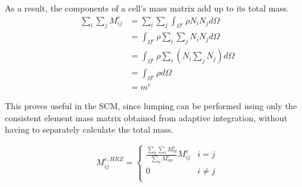 As a result, the components of a cell's mass matrix add up to its total mass.
\begin{equation}
\begin{aligned}
	\sum_i \sum_j M_{ij}^e &= \sum_i \sum_j \int_{\Omega^e} \rho N_i N_j d\Omega \\
	&= \int_{\Omega^e} \rho \sum_i \sum_j N_i N_j d\Omega \\
	&= \int_{\Omega^e} \rho \sum_i
	\left(
		N_i \sum_j N_j
	\right)
	d\Omega \\
	&= \int_{\Omega^e} \rho d\Omega \\
	&= m^e
\end{aligned}
\end{equation}

This proves useful in the SCM, since lumping can be performed using only the consistent
element mass matrix obtained from adaptive integration, without having to separately
calculate the total mass.

\begin{equation}
	M_{ij}^{e,HRZ} = \left\{ \begin{array}{ll}
	\frac{\sum_k \sum_l M_{kl}^e}{\sum_n M_{nn}^e} M_{ij}^e & i=j \\
	0 & i \neq j \\
	\end{array} \right.
\end{equation}